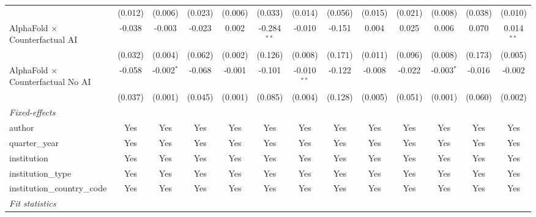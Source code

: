 \begin{tabular}{lcccccccccccc}
                                            & (0.012)       & (0.006)       & (0.023)      & (0.006) & (0.033)       & (0.014)       & (0.056) & (0.015) & (0.021)      & (0.008)      & (0.038)      & (0.010)\\   
   AlphaFold $\times$ Counterfactual AI     & -0.038        & -0.003        & -0.023       & 0.002   & -0.284$^{**}$ & -0.010        & -0.151  & 0.004   & 0.025        & 0.006        & 0.070        & 0.014$^{**}$\\   
                                            & (0.032)       & (0.004)       & (0.062)      & (0.002) & (0.126)       & (0.008)       & (0.171) & (0.011) & (0.096)      & (0.008)      & (0.173)      & (0.005)\\   
   AlphaFold $\times$ Counterfactual No AI  & -0.058        & -0.002$^{*}$  & -0.068       & -0.001  & -0.101        & -0.010$^{**}$ & -0.122  & -0.008  & -0.022       & -0.003$^{*}$ & -0.016       & -0.002\\   
                                            & (0.037)       & (0.001)       & (0.045)      & (0.001) & (0.085)       & (0.004)       & (0.128) & (0.005) & (0.051)      & (0.001)      & (0.060)      & (0.002)\\   
   \midrule
   \emph{Fixed-effects}\\
   author                                   & Yes           & Yes           & Yes          & Yes     & Yes           & Yes           & Yes     & Yes     & Yes          & Yes          & Yes          & Yes\\  
   quarter\_year                            & Yes           & Yes           & Yes          & Yes     & Yes           & Yes           & Yes     & Yes     & Yes          & Yes          & Yes          & Yes\\  
   institution                              & Yes           & Yes           & Yes          & Yes     & Yes           & Yes           & Yes     & Yes     & Yes          & Yes          & Yes          & Yes\\  
   institution\_type                        & Yes           & Yes           & Yes          & Yes     & Yes           & Yes           & Yes     & Yes     & Yes          & Yes          & Yes          & Yes\\  
   institution\_country\_code               & Yes           & Yes           & Yes          & Yes     & Yes           & Yes           & Yes     & Yes     & Yes          & Yes          & Yes          & Yes\\  
   \midrule
   \emph{Fit statistics}\\

\end{tabular}
